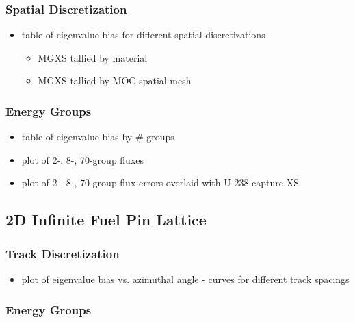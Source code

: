 \subsubsection{Spatial Discretization}
\label{subsubsec:chap4-pin-space}

\begin{itemize}
  \item table of eigenvalue bias for different spatial discretizations
  \begin{itemize}
    \item \ac{MGXS} tallied by material
    \item \ac{MGXS} tallied by \ac{MOC} spatial mesh
  \end{itemize}
\end{itemize}

\subsubsection{Energy Groups}
\label{subsubsec:chap4-pin-energy}

\begin{itemize}
  \item table of eigenvalue bias by \# groups
  \item plot of 2-, 8-, 70-group fluxes
  \item plot of 2-, 8-, 70-group flux errors overlaid with U-238 capture XS
\end{itemize}

\subsection{2D Infinite Fuel Pin Lattice}
\label{subsec:chap4-inf-lattice}

\subsubsection{Track Discretization}
\label{subsubsec:chap4-inf-lattice-tracks}

\begin{itemize}
  \item plot of eigenvalue bias vs. azimuthal angle - curves for different track spacings
\end{itemize}

\subsubsection{Energy Groups}
\label{subsubsec:chap4-pin-energy}

